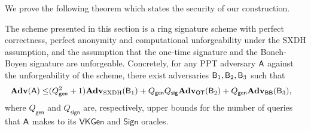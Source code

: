We prove the following theorem which states the security of our construction.

\begin{theorem}\label{theo:security-sxdh}
The scheme presented in this section is a ring signature scheme
with perfect correctness, perfect anonymity and computational unforgeability under the
$\mathrm{SXDH}$ assumption, and the assumption
that the one-time signature and the Boneh-Boyen signature are unforgeable.
Concretely, for any PPT adversary $\mathsf{A}$ against the unforgeability of the scheme, there exist adversaries $\mathsf{B}_1,\mathsf{B}_2,\mathsf{B}_3$ such that
\begin{align*}
\mathbf{Adv}(\mathsf{A})\leq &(Q_\mathsf{gen}^2+1)\mathbf{Adv}_{\mathrm{SXDH}}(\mathsf{B}_1)+Q_\mathsf{gen}Q_\mathsf{sig}\mathbf{Adv}_{\mathsf{OT}}(\mathsf{B}_2)+Q_\mathsf{gen}\mathbf{Adv}_{\mathsf{BB}}(\mathsf{B}_3),
\end{align*}
where $Q_\mathsf{gen}$ and $Q_\mathsf{sign}$ are, respectively, upper bounds for the number of queries that $\mathsf{A}$ makes to its $\mathsf{VKGen}$ and $\mathsf{Sign}$ oracles.
\end{theorem}

